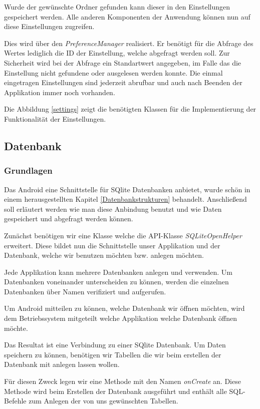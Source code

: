 Wurde der gewünschte Ordner gefunden kann dieser in den Einstellungen gespeichert werden. Alle anderen Komponenten der Anwendung können nun auf diese Einstellungen zugreifen.

Dies wird über den \textit{PreferenceManager} realisiert. Er benötigt für die Abfrage des Wertes lediglich die ID der Einstellung, welche abgefragt werden soll. Zur Sicherheit wird bei der Abfrage ein Standartwert angegeben, im Falle das die Einstellung nicht gefundene oder ausgelesen werden konnte. Die einmal eingetragen Einstellungen sind jederzeit abrufbar und auch nach Beenden der Applikation immer noch vorhanden.

Die Abbildung \ref{settings} zeigt die benötigten Klassen für die Implementierung der Funktionalität der Einstellungen.

\subsection{Datenbank}
\subsubsection{Grundlagen}
Das Android eine Schnittstelle für SQlite Datenbanken anbietet, wurde schön in einem herausgestellten Kapitel \ref{Datenbankstrukturen} behandelt. Anschließend soll erläutert werden wie man diese Anbindung benutzt und wie Daten gespeichert und abgefragt werden können.

Zunächst benötigen wir eine Klasse welche die API-Klasse \textit{SQLiteOpenHelper} erweitert. Diese bildet nun die Schnittstelle unser Applikation und der Datenbank, welche wir benutzen möchten bzw. anlegen möchten.

Jede Applikation kann mehrere Datenbanken anlegen und verwenden. Um Datenbanken voneinander unterscheiden zu können, werden die einzelnen Datenbanken über Namen verifiziert und aufgerufen.

Um Android mitteilen zu können, welche Datenbank wir öffnen möchten, wird dem Betriebssystem mitgeteilt welche Applikation welche Datenbank öffnen möchte.

Das Resultat ist eine Verbindung zu einer SQlite Datenbank. Um Daten speichern zu können, benötigen wir Tabellen die wir beim erstellen der Datenbank mit anlegen lassen wollen.

Für diesen Zweck legen wir eine Methode mit den Namen \textit{onCreate} an. Diese Methode wird beim Erstellen der Datenbank ausgeführt und enthält alle SQL-Befehle zum Anlegen der von uns gewünschten Tabellen.

